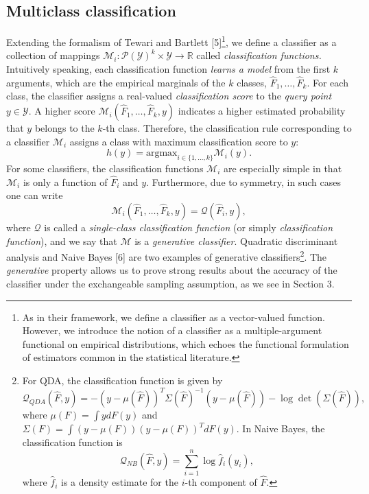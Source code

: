 \documentclass{article}
\newcommand{\argmax}{\text{argmax}}
\begin{document}
\subsection{Multiclass classification}

Extending the formalism of Tewari and Bartlett [5]\footnote{As in their framework,
we define a classifier as a vector-valued function.  However, we introduce the notion of a classifier as a multiple-argument functional on empirical distributions, which echoes the functional formulation of estimators common in the statistical literature.},
we define a classifier as a collection of mappings
$\mathcal{M}_i: \mathcal{P}(\mathcal{Y})^k \times \mathcal{Y} \to \mathbb{R}$ called \emph{classification functions.}
Intuitively speaking, each classification function \emph{learns a model} from the first $k$ arguments, which are
the empirical marginals of the $k$ classes, $\hat{F}_1,\hdots, \hat{F}_k$.  For each class, the classifier assigns a real-valued \emph{classification score} to the \emph{query point} $y \in \mathcal{Y}$.  A higher score $\mathcal{M}_i(\hat{F}_1,\hdots, \hat{F}_k, y)$ indicates a higher estimated probability that $y$ belongs to the $k$-th class.  
Therefore, the classification rule corresponding to a classifier $\mathcal{M}_i$ assigns
a class with maximum classification score to $y$:
\[
h(y) = \argmax_{i \in \{1,\hdots, k\}} \mathcal{M}_i(y).
\]
For some classifiers, the classification functions $\mathcal{M}_i$ are especially simple
in that $\mathcal{M}_i$ is only a function of $\hat{F}_i$ and $y$.
Furthermore, due to symmetry, in such cases one can write
\[
\mathcal{M}_i(\hat{F}_1,\hdots, \hat{F}_k, y) = \mathcal{Q}(\hat{F}_i, y),
\]
where $\mathcal{Q}$ is called a \emph{single-class classification function} (or simply \emph{classification function}),
and we say that $\mathcal{M}$ is a \emph{generative classifier}.
Quadratic discriminant analysis and Naive Bayes [6] are two examples of
generative classifiers\footnote{For QDA, the classification function is given by
\[
\mathcal{Q}_{QDA}(\hat{F}, y) = -(y - \mu(\hat{F}))^T \Sigma(\hat{F})^{-1} (y-\mu(\hat{F})) - \log\det(\Sigma(\hat{F})),
\]
where $\mu(F) = \int y dF(y)$ and $\Sigma(F) = \int (y-\mu(F))(y-\mu(F))^T dF(y)$.
In Naive Bayes, the classification function is
\[
\mathcal{Q}_{NB}(\hat{F},  y) = \sum_{i=1}^n \log \hat{f}_i(y_i),
\]
where $\hat{f}_i$ is a density estimate for the $i$-th component of
$\hat{F}$.}.
The \emph{generative} property allows us to prove strong results about the accuracy of the classifier
under the exchangeable sampling assumption, as we see in Section 3.
\end{document}
